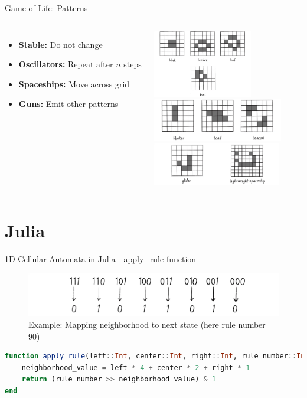 \begin{frame}{Game of Life: Patterns}
    \begin{columns}
        \begin{itemize}
            \item \textbf{Stable:} Do not change
            \item \textbf{Oscillators:} Repeat after $n$ steps
            \item \textbf{Spaceships:} Move across grid
            \item \textbf{Guns:} Emit other patterns
        \end{itemize}
        \centering
        \includegraphics[height=8em]{../paper/figures/stable}\\
        \includegraphics[height=5em]{../paper/figures/oscillator}\\
        \includegraphics[height=5em]{../paper/figures/spaceship}

    \end{columns}
\end{frame}


\section{Julia}
\begin{frame}[fragile]{1D Cellular Automata in Julia - apply\_rule function}
    \begin{figure}
        \centering
        \includegraphics[width=\textwidth]{../paper/figures/ruleset_example.png}
        \caption{Example: Mapping neighborhood to next state (here rule number 90)}
    \end{figure}
    \begin{lstlisting}[language=Julia, caption={apply\_rule function for 1D Cellular Automata}, basicstyle=\ttfamily\scriptsize]
function apply_rule(left::Int, center::Int, right::Int, rule_number::Int)::Int
    neighborhood_value = left * 4 + center * 2 + right * 1
    return (rule_number >> neighborhood_value) & 1
end
\end{lstlisting}
\end{frame}

